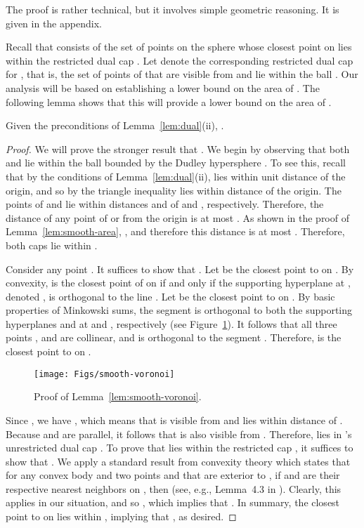 \documentclass[11pt]{article}   \usepackage[letterpaper,hmargin=2.1cm,vmargin=3cm]{geometry}
\begin{document}
The proof is rather technical, but it involves simple geometric reasoning. It is given in the appendix.

Recall that  consists of the set of points on the sphere  whose closest point on  lies within the restricted dual cap . Let  denote the corresponding restricted dual cap for , that is, the set of points of  that are visible from  and lie within the ball . Our analysis will be based on establishing a lower bound on the area of . The following lemma shows that this will provide a lower bound on the area of .

\begin{lemma} \label{lem:smooth-voronoi}
Given the preconditions of Lemma~\ref{lem:dual}(ii), .
\end{lemma}


\begin{proof}
We will prove the stronger result that . We begin by observing that both  and  lie within the ball bounded by the Dudley hypersphere . To see this, recall that by the conditions of Lemma~\ref{lem:dual}(ii),  lies within unit distance of the origin, and so by the triangle inequality  lies within distance  of the origin. The points of  and  lie within distances  and  of  and , respectively. Therefore, the distance of any point of  or  from the origin is at most . As shown in the proof of Lemma~\ref{lem:smooth-area}, , and therefore this distance is at most . Therefore, both caps lie within . 

Consider any point . It suffices to show that . Let  be the closest point to  on . By convexity,  is the closest point of  on  if and only if the supporting hyperplane at , denoted , is orthogonal to the line .  Let  be the closest point to  on . By basic properties of Minkowski sums, the segment  is orthogonal to both the supporting hyperplanes  and  at  and , respectively (see Figure~\ref{fig:smooth-voronoi}). It follows that all three points ,  and  are collinear, and  is orthogonal to the segment . Therefore,  is the closest point to  on .

\begin{figure}[htbp]
  \centerline{\texttt{[image: Figs/smooth-voronoi]}}
  \caption{Proof of Lemma~\ref{lem:smooth-voronoi}.}
  \label{fig:smooth-voronoi}
\end{figure}


Since , we have , which means that  is visible from  and  lies within distance  of . Because  and  are parallel, it follows that  is also visible from . Therefore,  lies in 's unrestricted dual cap . To prove that  lies within the restricted cap , it suffices to show that . We apply a standard result from convexity theory which states that for any convex body  and two points  and  that are exterior to , if  and  are their respective nearest neighbors on , then  (see, e.g., Lemma~{4.3} in \cite{Dudley}). Clearly, this applies in our situation, and so , which implies that . In summary, the closest point to  on  lies within , implying that , as desired.
\end{proof}
\end{document}
